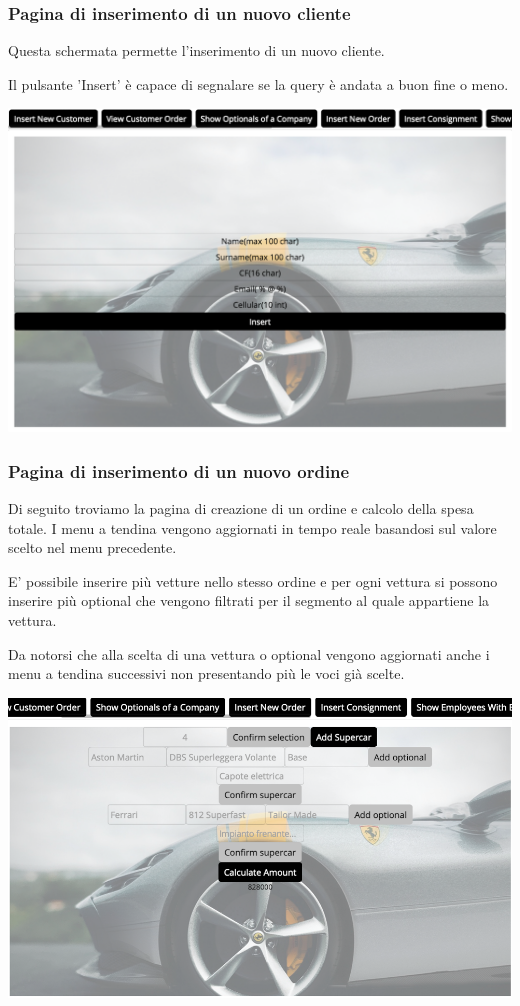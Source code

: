 \documentclass[11pt]{article}
\begin{document}
\subsubsection{Pagina di inserimento di un nuovo cliente}
Questa schermata permette l'inserimento di un nuovo cliente.

Il pulsante 'Insert' è capace di segnalare se la query è andata a buon fine o meno.

\begin{center}
    \includegraphics[width=\linewidth]{images/app/insertCostumer.png}
\end{center}

\subsubsection{Pagina di inserimento di un nuovo ordine}
Di seguito troviamo la pagina di creazione di un ordine e calcolo della spesa
totale. I menu a tendina vengono aggiornati in tempo reale basandosi sul valore
scelto nel menu precedente.

E' possibile inserire più vetture nello stesso ordine e per ogni vettura si
possono inserire più optional che vengono filtrati per il segmento al quale
appartiene la vettura.

Da notorsi che alla scelta di una vettura o optional vengono aggiornati anche i
menu a tendina successivi non presentando più le voci già scelte.

\begin{center}
    \includegraphics[width=\linewidth]{images/app/addOrder.png}
\end{center}
\end{document}
